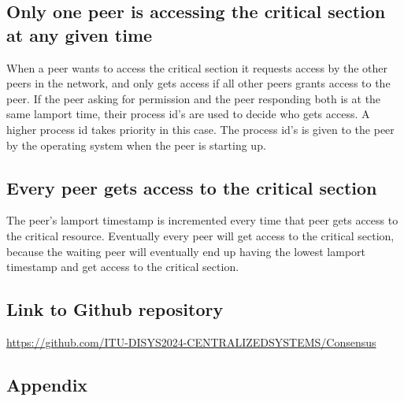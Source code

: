\documentclass[a4paper,11pt]{article}
\begin{document}
\subsection*{Only one peer is accessing the critical section at any given time}
When a peer wants to access the critical section it requests access by the other peers in the network, and only gets access if all other peers grants access to the peer.
If the peer asking for permission and the peer responding both is at the same lamport time, their process id's are used to decide who gets access. A higher process id takes priority in this case.
The process id's is given to the peer by the operating system when the peer is starting up.

\subsection*{Every peer gets access to the critical section}
The peer's lamport timestamp is incremented every time that peer gets access to the critical resource.
Eventually every peer will get access to the critical section, because the waiting peer will eventually end up having the lowest lamport timestamp and get access to the critical section.

\newpage
\subsection*{Link to Github repository}

\href{https://github.com/ITU-DISYS2024-CENTRALIZEDSYSTEMS/Consensus}{https://github.com/ITU-DISYS2024-CENTRALIZEDSYSTEMS/Consensus}

\subsection*{Appendix}
\end{document}
